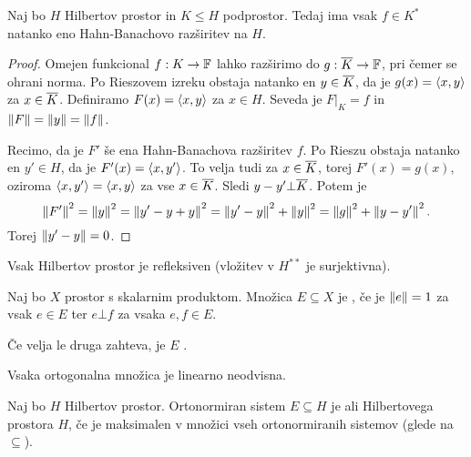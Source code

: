 \begin{izrek}
  Naj bo $H$ Hilbertov prostor in $K \le H$ podprostor.
  Tedaj ima vsak $f \in K^*$ natanko eno Hahn-Banachovo razširitev na $H$.
\end{izrek}

\begin{proof}
  Omejen funkcional $f: K \to \mathbb{F}$ lahko razširimo do $g: \overline{K} \to \mathbb{F}$, pri
  čemer se ohrani norma.
  Po Rieszovem izreku obstaja natanko en $y \in \overline{K}$, da je $g(x) =
  \left< x,y \right>$ za $x \in \overline{K}$.
  Definiramo $F(x) = \left< x,y \right>$ za $x \in H$.
  Seveda je $\left. F \right|_K = f$ in $\left\lVert F\right\rVert = \left\lVert y\right\rVert = \left\lVert f\right\rVert$.

  Recimo, da je $F'$ še ena Hahn-Banachova razširitev $f$.
  Po Rieszu obstaja natanko en $y' \in H$, da je $F'(x) = \left< x,y' \right>$.
  To velja tudi za $x \in \overline{K}$, torej $F'(x) = g(x)$,
  oziroma $\left< x,y' \right> = \left< x,y \right>$ za vse $x \in \overline{K}$.
  Sledi $y-y' \bot \overline{K}$.
  Potem je
  \[
	\left\lVert F'\right\rVert^2 = \left\lVert y\right\rVert^2 = \left\lVert y' - y + y\right\rVert^2
	= \left\lVert y' - y\right\rVert^2 + \left\lVert y\right\rVert^2 = \left\lVert g\right\rVert^2 + \left\lVert y - y'\right\rVert^2.
  \]
  Torej $\left\lVert y'-y\right\rVert = 0$.
\end{proof}

\begin{posledica}
  Vsak Hilbertov prostor je refleksiven (vložitev v $H^{**}$ je surjektivna).
\end{posledica}



\begin{definicija}
  Naj bo $X$ prostor s skalarnim produktom.
  Množica $E \subseteq X$ je , če je $\left\lVert e\right\rVert = 1$
  za vsak $e \in E$ ter $e \bot f$ za vsaka $e,f \in E$.
\end{definicija}

\begin{opomba}
  Če velja le druga zahteva, je $E$ .
\end{opomba}

\begin{lema}
  Vsaka ortogonalna množica je linearno neodvisna.
\end{lema}

\begin{definicija}
  Naj bo $H$ Hilbertov prostor. Ortonormiran sistem $E \subseteq H$ je
   ali  Hilbertovega prostora $H$, če je maksimalen
  v množici vseh ortonormiranih sistemov (glede na $\subseteq$).
\end{definicija}

